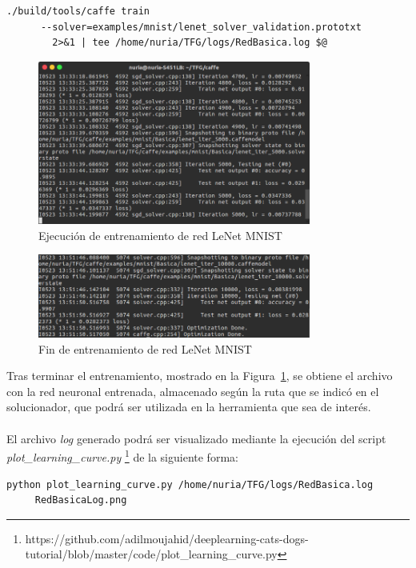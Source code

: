 \begin{description}
\begin{lstlisting}[frame=single]
	./build/tools/caffe train 
	  --solver=examples/mnist/lenet_solver_validation.prototxt 
	    2>&1 | tee /home/nuria/TFG/logs/RedBasica.log $@
	\end{lstlisting}
	
	\begin{figure}[h!]
		\begin{center}
			\includegraphics[width=0.8\textwidth]{figures/RedBasica5000}
			\caption{Ejecución de entrenamiento de red LeNet MNIST}
		\end{center}
	\end{figure}
	
	\begin{figure}[h!]
		\begin{center}
			\includegraphics[width=0.8\textwidth]{figures/RedBasicaFin}
			\caption{Fin de entrenamiento de red LeNet MNIST}
			\label{fig.finEntrBas}
		\end{center}
	\end{figure}
	\vspace{30pt}
	Tras terminar el entrenamiento, mostrado en la Figura~\ref{fig.finEntrBas}, se obtiene el archivo con la red neuronal entrenada, almacenado según la ruta que se indicó en el solucionador, que podrá ser utilizada en la herramienta que sea de interés.\\
	\vspace{-10pt}
	\\
	El archivo \textit{log} generado podrá ser visualizado mediante la ejecución del script \textit{plot\_learning\_curve.py} \footnote{https://github.com/adilmoujahid/deeplearning-cats-dogs-tutorial/blob/master/code/plot\_learning\_curve.py} de la siguiente forma:
	\vspace{10pt}
	\begin{lstlisting}[frame=single]
	python plot_learning_curve.py /home/nuria/TFG/logs/RedBasica.log 
	 RedBasicaLog.png
	\end{lstlisting}
	

\end{description}
